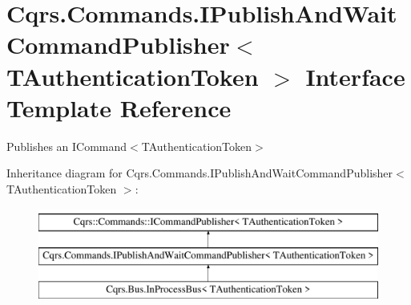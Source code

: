 \hypertarget{interfaceCqrs_1_1Commands_1_1IPublishAndWaitCommandPublisher}{}\section{Cqrs.\+Commands.\+I\+Publish\+And\+Wait\+Command\+Publisher$<$ T\+Authentication\+Token $>$ Interface Template Reference}
\label{interfaceCqrs_1_1Commands_1_1IPublishAndWaitCommandPublisher}


Publishes an I\+Command$<$\+T\+Authentication\+Token$>$  


Inheritance diagram for Cqrs.\+Commands.\+I\+Publish\+And\+Wait\+Command\+Publisher$<$ T\+Authentication\+Token $>$\+:\begin{figure}[H]
\begin{center}
\leavevmode
\includegraphics[height=3.000000cm]{interfaceCqrs_1_1Commands_1_1IPublishAndWaitCommandPublisher}
\end{center}
\end{figure}
